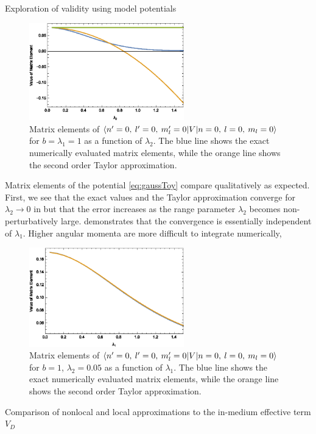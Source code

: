 \begin{section}{Exploration of validity using model potentials \label{sec:toyModel}}
\begin{figure}[htb]
\centering \includegraphics[width=0.6\textwidth]{LocalExpansion/Figures/ToyPotential000000} 
\caption{Matrix elements of $\braket{n'=0,\: l'=0,\: m_l'=0 | V | n=0,\: l=0,\: m_l=0}$ for $b=\lambda_1=1$ as a function of $\lambda_2$. The blue line shows the exact numerically evaluated matrix elements, while the orange line shows the second order Taylor approximation.
\label{fig:gaussToy1}}
\end{figure}

Matrix elements of the potential \eqref{eq:gaussToy} compare qualitatively as expected. First, we see that the exact values and the Taylor approximation converge for $\lambda_2\rightarrow 0$ in  but that the error increases as the range parameter $\lambda_2$ becomes non-perturbatively large.  demonstrates that the convergence is essentially independent of $\lambda_1$. Higher angular momenta are more difficult to integrate numerically, 


\begin{figure}[htb]
\centering \includegraphics[width=0.6\textwidth]{LocalExpansion/Figures/ToyPotential000000l1} 
\caption{Matrix elements of $\braket{n'=0,\: l'=0,\: m_l'=0 | V | n=0,\: l=0,\: m_l=0}$ for $b=1$, $\lambda_2=0.05$ as a function of $\lambda_1$. The blue line shows the exact numerically evaluated matrix elements, while the orange line shows the second order Taylor approximation.
\label{fig:gaussToy2}}
\end{figure}



\end{section}
\begin{section}{Comparison of nonlocal and local approximations to the in-medium effective term $V_D$ }

\end{section}
